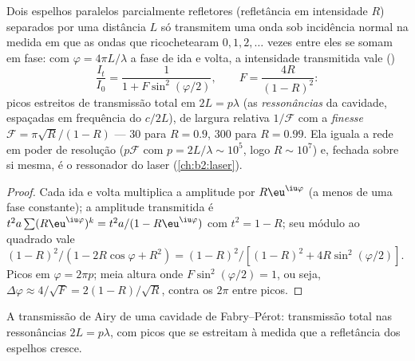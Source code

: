 \begin{proposition}\label{prop:b2:gratings:fabryperot}
Dois espelhos paralelos parcialmente refletores (refletância em intensidade $R$)
separados por uma distância $L$ só transmitem uma onda sob incidência normal na medida
em que as ondas que ricochetearam $0, 1, 2, \dots$ vezes entre eles se somam
em fase: com $\varphi = 4\pi L/\lambda$ a fase de ida e volta, a intensidade
transmitida vale ()
\[
\frac{I_t}{I_0} = \frac1{1 + F\sin^2(\varphi/2)} , \qquad F = \frac{4R}{(1 - R)^2} :
\]
picos estreitos de transmissão total em $2L = p\lambda$ (as \emph{ressonâncias}
da cavidade, espaçadas em frequência do \emph{}
$c/2L$), de largura relativa $1/\mathcal F$ com a \emph{finesse} $\mathcal F = \pi
\sqrt R/(1 - R)$ --- $30$ para $R = 0.9$, $300$ para $R = 0.99$. Ela iguala a rede
em poder de resolução ($p\mathcal F$ com $p = 2L/\lambda \sim 10^5$, logo $R \sim
10^7$) e, fechada sobre si mesma, é o ressonador do laser
(\cref{ch:b2:laser}).
\end{proposition}

\begin{proof}
Cada ida e volta multiplica a amplitude por $R\eu^{\iu\varphi}$ (a menos de uma
fase constante); a amplitude transmitida é $t^2a\sum(R\eu^{\iu\varphi})^k =
t^2a/(1 - R\eu^{\iu\varphi})$ com $t^2 = 1 - R$; seu módulo ao quadrado vale $(1 - R)^2/
(1 - 2R\cos\varphi + R^2) = (1 - R)^2/[(1 - R)^2 + 4R\sin^2(\varphi/2)]$. Picos em
$\varphi = 2\pi p$; meia altura onde $F\sin^2(\varphi/2) = 1$, ou seja, $\Delta\varphi \approx
4/\sqrt F = 2(1 - R)/\sqrt R$, contra os $2\pi$ entre picos.
\end{proof}

\begin{omfigure}

{\small A transmissão de Airy de uma cavidade de Fabry--Pérot: transmissão
total nas ressonâncias $2L = p\lambda$, com picos que se estreitam à medida que a
refletância dos espelhos cresce.}
\end{omfigure}

